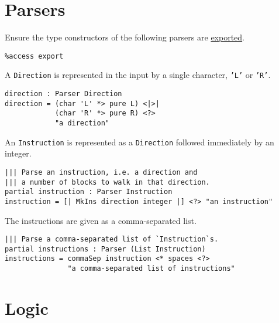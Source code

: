\documentclass[b5paper,twoside]{amsbook}
\begin{document}
\section{Parsers}\label{parsers}

Ensure the type constructors of the following parsers are
\href{http://docs.idris-lang.org/en/latest/tutorial/modules.html\#meaning-for-data-types}{exported}.

\begin{verbatim}
%access export
\end{verbatim}

A \texttt{Direction} is represented in the input by a
single character, \texttt{'L'} or
\texttt{'R'}.

\begin{verbatim}
direction : Parser Direction
direction = (char 'L' *> pure L) <|>|
            (char 'R' *> pure R) <?>
            "a direction"
\end{verbatim}

\newpage

An \texttt{Instruction} is represented as a
\texttt{Direction} followed immediately by an integer.

\begin{verbatim}
||| Parse an instruction, i.e. a direction and
||| a number of blocks to walk in that direction.
partial instruction : Parser Instruction
instruction = [| MkIns direction integer |] <?> "an instruction"
\end{verbatim}

The instructions are given as a comma-separated list.

\begin{verbatim}
||| Parse a comma-separated list of `Instruction`s.
partial instructions : Parser (List Instruction)
instructions = commaSep instruction <* spaces <?>
               "a comma-separated list of instructions"
\end{verbatim}

\section{Logic}\label{logic}
\end{document}
